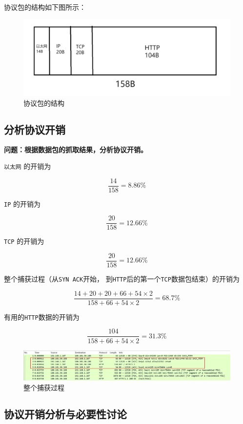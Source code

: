 \documentclass{article}
\begin{document}
协议包的结构如下图所示：

\begin{figure}[H]
  \centering
  \includegraphics[width=15cm]{images/10.png}
  \caption{协议包的结构}
\end{figure}

\subsection{分析协议开销}

\textbf{问题：根据数据包的抓取结果，分析协议开销。}

\texttt{以太网} 的开销为

$$
  \frac{14}{158}=8.86\%
$$

\texttt{IP} 的开销为

$$
  \frac{20}{158}=12.66\%
$$

\texttt{TCP} 的开销为

$$
  \frac{20}{158}=12.66\%
$$

整个捕获过程（从\texttt{SYN ACK}开始，
到\texttt{HTTP}后的第一个\texttt{TCP}数据包结束）的开销为

$$
  \frac{14+20+20+ 66 + 54 \times 2}{158 + 66 + 54 \times 2}= 68.7\%
$$

有用的\texttt{HTTP}数据的开销为

$$
  \frac{104}{158 + 66 + 54 \times 2}= 31.3\%
$$

\begin{figure}[H]
  \centering
  \includegraphics[width=15cm]{images/11.png}
  \caption{整个捕获过程}
\end{figure}

\subsection{协议开销分析与必要性讨论}
\end{document}
